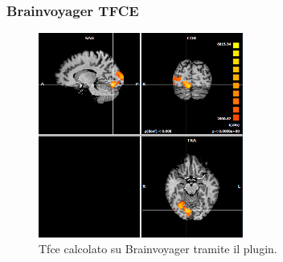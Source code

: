 \documentclass{beamer}
\begin{document}
\begin{frame}
\frametitle{Brainvoyager TFCE}
\begin{figure}
	\centering
        \includegraphics[width=0.60\textwidth]{Images/Brainvoyager-TFCE83187129.png}
	\caption{Tfce calcolato su Brainvoyager tramite il plugin.}
\end{figure}
\end{frame}
\end{document}
